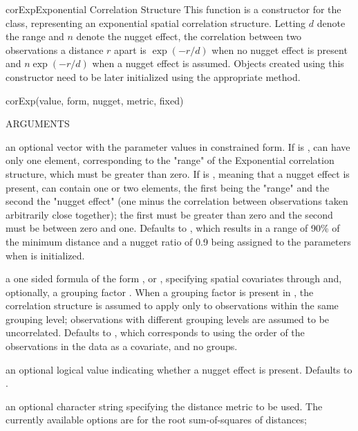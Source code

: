 \documentclass[pdftex]{article} \usepackage{url,graphicx}
\renewcommand{\Twiddle}{\mbox{\(\sim\)}}
\begin{document}
\begin{Helpfile}{corExp}{Exponential Correlation Structure}
This function is a constructor for the  class,
representing an exponential spatial correlation structure. Letting
$d$ denote the range and $n$ denote the nugget
effect, the correlation between two observations a distance
$r$ apart is $\exp(-r/d)$ when no nugget effect
is present and $n\exp(-r/d)$ when a nugget effect is
assumed. Objects created using this constructor need to be later
initialized using the appropriate  method.
\begin{Example}
corExp(value, form, nugget, metric, fixed)
\end{Example}
\begin{Argument}{ARGUMENTS}
\item[\Co{value:}] an optional vector with the parameter values in
  constrained form. If  is ,  can have
  only one element, corresponding to the "range" of the Exponential
  correlation structure, which must be greater than zero. If
   is , meaning that a nugget effect is present,
   can contain one or two elements, the first being the
  "range" and the second the "nugget effect" (one minus the
  correlation between observations taken arbitrarily close together);
  the first must be greater than zero and the second must be between
  zero and one. Defaults to , which results in a range
  of 90\% of the minimum distance and a nugget ratio of 0.9 being
  assigned to the parameters when  is initialized.
\item[\Co{form:}] a one sided formula of the form \Co{{\Twiddle}
    S1+...+Sp}, or \Co{{\Twiddle} S1+...+Sp | g}, specifying spatial
  covariates  through  and, optionally, a grouping
  factor .  When a grouping factor is present in , the
  correlation structure is assumed to apply only to observations
  within the same grouping level; observations with different grouping
  levels are assumed to be uncorrelated. Defaults to \Co{{\Twiddle}
    1}, which corresponds to using the order of the observations in
  the data as a covariate, and no groups.
\item[\Co{nugget:}] an optional logical value indicating whether a
  nugget effect is present. Defaults to .
\item[\Co{metric:}] an optional character string specifying the
  distance metric to be used. The currently available options are
   for the root sum-of-squares of distances;

\end{Argument}
\end{Helpfile}
\end{document}

